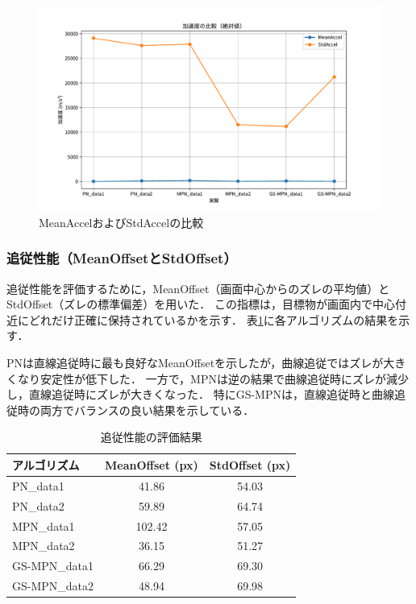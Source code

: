 \begin{figure}[H]
    \centering
    \includegraphics[width=1\textwidth]{figure/Accel.pdf}
    \caption{MeanAccelおよびStdAccelの比較}
    \label{fig:accel_results}
\end{figure}

\subsubsection{追従性能（MeanOffsetとStdOffset）}
追従性能を評価するために，MeanOffset（画面中心からのズレの平均値）とStdOffset（ズレの標準偏差）を用いた．
この指標は，目標物が画面内で中心付近にどれだけ正確に保持されているかを示す．
表\ref{tab:offset_results}に各アルゴリズムの結果を示す．

PNは直線追従時に最も良好なMeanOffsetを示したが，曲線追従ではズレが大きくなり安定性が低下した．
一方で，MPNは逆の結果で曲線追従時にズレが減少し，直線追従時にズレが大きくなった．
特にGS-MPNは，直線追従時と曲線追従時の両方でバランスの良い結果を示している．

\begin{table}[H]
    \centering
    \caption{追従性能の評価結果}
    \label{tab:offset_results}
    \begin{tabular}{|l|c|c|}
        \hline
        \textbf{アルゴリズム} & \textbf{MeanOffset (px)} & \textbf{StdOffset (px)} \\ \hline
        PN\_data1             & 41.86                    & 54.03                   \\ \hline
        PN\_data2             & 59.89                    & 64.74                   \\ \hline
        MPN\_data1            & 102.42                   & 57.05                   \\ \hline
        MPN\_data2            & 36.15                    & 51.27                   \\ \hline
        GS-MPN\_data1         & 66.29                    & 69.30                   \\ \hline
        GS-MPN\_data2         & 48.94                    & 69.98                   \\ \hline
    \end{tabular}
\end{table}



